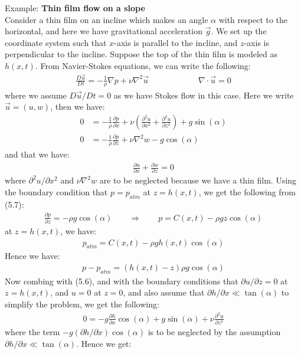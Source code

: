 \documentclass[11pt]{book}
\theoremstyle{break}
\theoremstyle{break}
\newcommand{\pd}{\partial}
\newcommand{\example}{\color{green}Example: \color{black}}
\begin{document}
\example \textbf{Thin film flow on a slope}\\
Consider a thin film on an incline which makes an angle $\alpha$ with respect to the horizontal, and here we have gravitational acceleration $\vec{g}$. We set up the coordinate system such that $x$-axis is parallel to the incline, and $z$-axis is perpendicular to the incline. Suppose the top of the thin film is modeled as $h(x,t)$. From Navier-Stokes equations, we can write the following:
\begin{align*}
\frac{D\vec{u}}{Dt} = -\frac{1}{\rho}\nabla p + \nu \nabla^2 \vec{u} \qquad\qquad\qquad \nabla\cdot \vec{u} = 0
\end{align*}
where we assume $D\vec{u}/Dt= 0$ as we have Stokes flow in this case. Here we write $\vec{u} = (u,w)$, then we have:
\begin{align}
0 &= -\frac{1}{\rho}\frac{\pd p}{\pd x} + \nu \left( \frac{\pd^2u}{\pd x^2} + \frac{\pd^2 u}{\pd z^2}\right)  + g\sin(\alpha)\\
0 &= -\frac{1}{\rho} \frac{\pd p}{\pd z} + \nu \nabla^2 w - g\cos(\alpha)
\end{align}
and that we have:
\begin{align}
\frac{\pd u}{\pd x} + \frac{\pd w}{\pd z} = 0 
\end{align}
where $\pd^2 u /\pd x^2$ and $\nu \nabla^2 w$ are to be neglected because we have a thin film. Using the boundary condition that $p = p_{atm}$ at $z = h(x,t)$, we get the following from (5.7):
\begin{align*}
\frac{\pd p}{\pd z} = -\rho g \cos(\alpha) \qquad \Rightarrow \qquad p = C(x,t) - \rho g z \cos(\alpha)
\end{align*}
at $z = h(x,t)$, we have:
\begin{align*}
p_{atm} = C(x,t)-\rho g h(x,t) \cos(\alpha)
\end{align*}
Hence we have:
\begin{align*}
p - p_{atm} =(h(x,t) - z) \rho g \cos(\alpha)
\end{align*}
Now combing with (5.6), and with the boundary conditions that $\pd u/\pd z = 0$ at $z = h(x,t)$, and $u = 0$ at $z = 0$, and also assume that $\pd h / \pd x \ll \tan(\alpha)$ to simplify the problem, we get the following:
\begin{align*}
0 = -g \frac{\pd h}{\pd x} \cos(\alpha) + g\sin(\alpha) + \nu \frac{\pd^2 u}{\pd z^2}
\end{align*}
where the term $-g (\pd h / \pd x) \cos(\alpha) $ is to be neglected by the assumption  $\pd h / \pd x \ll \tan(\alpha)$. Hence we get:
\end{document}
